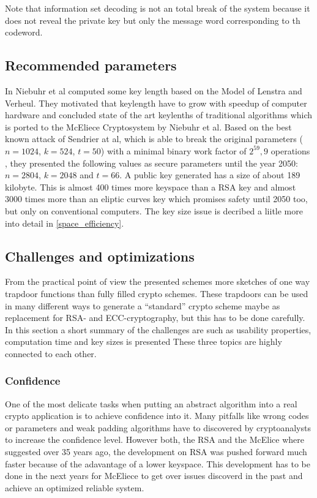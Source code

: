  Note that information set decoding is not an total break of the system because it does not reveal the private key but only the message word corresponding to th codeword. 


\subsection*{Recommended parameters}
In \cite{niebuhr2012selecting} Niebuhr et al computed some key length based on the Model of Lenstra and Verheul. They motivated that keylength have to grow with speedup of computer hardware and concluded state of the art keylenths of traditional algorithms which is ported to the McEliece Cryptosystem by Niebuhr et al. Based on the best known attack of Sendrier at al, which is able to break the original parameters ($n = 1024$, $k = 524$, $t = 50$) with a minimal binary work factor of $2^59,9$ operations \cite{finiasz2009security}, they presented the following values as secure parameters until the year 2050: $n = 2804$, $k = 2048$ and $t = 66$. A public key generated has a size of about 189 kilobyte. This is almost 400 times more keyspace than a RSA key and almost 3000 times more than an eliptic curves key which promises safety until 2050 too, but only on conventional computers. The key size issue is decribed a liitle more into detail in \ref{space_efficiency}.


\subsection*{Challenges and optimizations} %
From the practical point of view the presented schemes more sketches of one way trapdoor functions than fully filled crypto schemes. These trapdoors can be used in many different ways to generate a ``standard'' crypto scheme maybe as replacement for RSA- and ECC-cryptography, but this has to be done carefully. In this section a short summary of the challenges are such as usability properties, computation time and key sizes is presented  These three topics are highly connected to each other. 

\subsubsection*{Confidence}
\label{confidence}
One of the most delicate tasks when putting an abstract algorithm into a real crypto application is to achieve confidence into it. Many pitfalls like wrong codes or parameters and weak padding algorithms have to discovered by cryptoanalysts to increase the confidence level. However both, the RSA and the McElice where suggested over 35 years ago, the development on RSA was pushed forward much faster because of the adavantage of a lower keyspace. This development has to be done in the next years for McEliece to get over issues discoverd in the past and achieve an optimized reliable system. 

